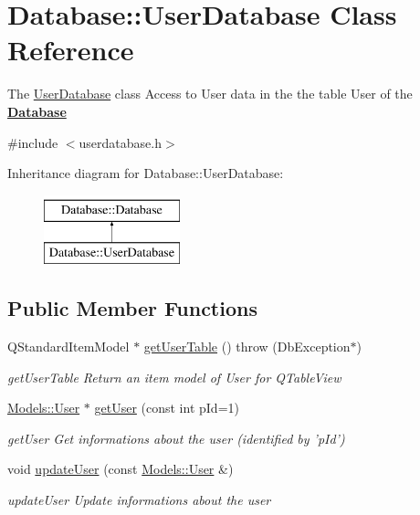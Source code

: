 \hypertarget{classDatabase_1_1UserDatabase}{\section{Database\+:\+:User\+Database Class Reference}
\label{classDatabase_1_1UserDatabase}
}


The \hyperlink{classDatabase_1_1UserDatabase}{User\+Database} class Access to User data in the the table User of the {\bfseries \hyperlink{classDatabase_1_1Database}{Database}}  




{\ttfamily \#include $<$userdatabase.\+h$>$}

Inheritance diagram for Database\+:\+:User\+Database\+:\begin{figure}[H]
\begin{center}
\leavevmode
\includegraphics[height=2.000000cm]{d9/d32/classDatabase_1_1UserDatabase}
\end{center}
\end{figure}
\subsection*{Public Member Functions}
\begin{DoxyCompactItemize}
\item 
Q\+Standard\+Item\+Model $\ast$ \hyperlink{classDatabase_1_1UserDatabase_a1b35f88b06fc54521bb72acd1fbbdc1e}{get\+User\+Table} ()  throw (\+Db\+Exception$\ast$)
\begin{DoxyCompactList}\small\item\em get\+User\+Table Return an item model of User for Q\+Table\+View \end{DoxyCompactList}\item 
\hyperlink{classModels_1_1User}{Models\+::\+User} $\ast$ \hyperlink{classDatabase_1_1UserDatabase_ad05795be223fef14a114d712aebef2e6}{get\+User} (const int p\+Id=1)
\begin{DoxyCompactList}\small\item\em get\+User Get informations about the user (identified by 'p\+Id') \end{DoxyCompactList}\item 
\hypertarget{classDatabase_1_1UserDatabase_af00cc95c910ab6ca3dbeef591531ae2b}{void \hyperlink{classDatabase_1_1UserDatabase_af00cc95c910ab6ca3dbeef591531ae2b}{update\+User} (const \hyperlink{classModels_1_1User}{Models\+::\+User} \&)}\label{classDatabase_1_1UserDatabase_af00cc95c910ab6ca3dbeef591531ae2b}

\begin{DoxyCompactList}\small\item\em update\+User Update informations about the user \end{DoxyCompactList}\end{DoxyCompactItemize}
